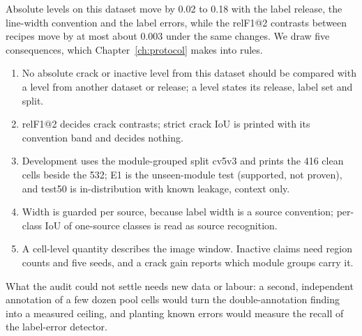 Absolute levels on this dataset move by 0.02 to 0.18 with the label release, the line-width convention and the label errors, while
the relF1@2 contrasts between recipes move by at most about 0.003 under the same changes. We draw five consequences, which
Chapter~\ref{ch:protocol} makes into rules.
\begin{enumerate}
  \item No absolute crack or inactive level from this dataset should be compared with a level from another dataset or release; a
    level states its release, label set and split.
  \item relF1@2 decides crack contrasts; strict crack IoU is printed with its convention band and decides nothing.
  \item Development uses the module-grouped split cv5v3 and prints the 416 clean cells beside the 532; E1 is the unseen-module test
    (supported, not proven), and test50 is in-distribution with known leakage, context only.
  \item Width is guarded per source, because label width is a source convention; per-class IoU of one-source classes is read as
    source recognition.
  \item A cell-level quantity describes the image window. Inactive claims need region counts and five seeds, and a crack gain
    reports which module groups carry it.
\end{enumerate}
What the audit could not settle needs new data or labour: a second, independent annotation of a few dozen pool cells would turn
the double-annotation finding into a measured ceiling, and planting known errors would measure the recall of the label-error
detector.
